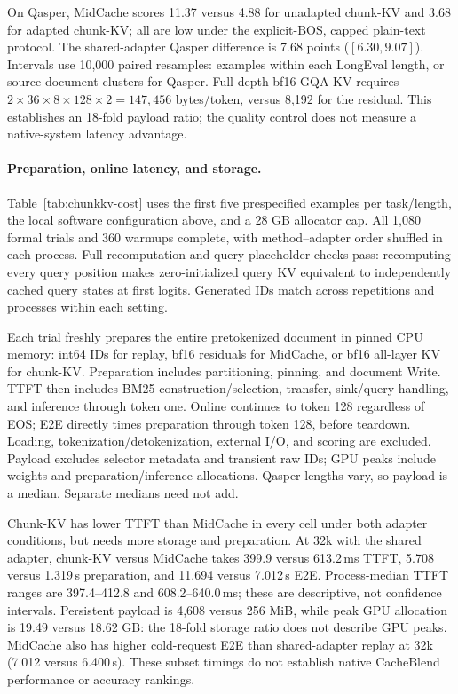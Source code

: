 On Qasper, MidCache scores 11.37 versus 4.88 for unadapted chunk-KV and 3.68 for adapted chunk-KV; all are low under the explicit-BOS, capped plain-text protocol. The shared-adapter Qasper difference is 7.68 points ($[6.30,9.07]$). Intervals use 10,000 paired resamples: examples within each LongEval length, or source-document clusters for Qasper. Full-depth bf16 GQA KV requires $2\times36\times8\times128\times2=147{,}456$ bytes/token, versus 8,192 for the residual. This establishes an 18-fold payload ratio; the quality control does not measure a native-system latency advantage.

\paragraph{Preparation, online latency, and storage.}

Table~\ref{tab:chunkkv-cost} uses the first five prespecified examples per task/length, the local software configuration above, and a 28 GB allocator cap. All 1,080 formal trials and 360 warmups complete, with method--adapter order shuffled in each process. Full-recomputation and query-placeholder checks pass: recomputing every query position makes zero-initialized query KV equivalent to independently cached query states at first logits. Generated IDs match across repetitions and processes within each setting.

Each trial freshly prepares the entire pretokenized document in pinned CPU memory: int64 IDs for replay, bf16 residuals for MidCache, or bf16 all-layer KV for chunk-KV. Preparation includes partitioning, pinning, and document Write. TTFT then includes BM25 construction/selection, transfer, sink/query handling, and inference through token one. Online continues to token 128 regardless of EOS; E2E directly times preparation through token 128, before teardown. Loading, tokenization/detokenization, external I/O, and scoring are excluded. Payload excludes selector metadata and transient raw IDs; GPU peaks include weights and preparation/inference allocations. Qasper lengths vary, so payload is a median. Separate medians need not add.

Chunk-KV has lower TTFT than MidCache in every cell under both adapter conditions, but needs more storage and preparation. At 32k with the shared adapter, chunk-KV versus MidCache takes 399.9 versus 613.2\,ms TTFT, 5.708 versus 1.319\,s preparation, and 11.694 versus 7.012\,s E2E. Process-median TTFT ranges are 397.4--412.8 and 608.2--640.0\,ms; these are descriptive, not confidence intervals. Persistent payload is 4,608 versus 256 MiB, while peak GPU allocation is 19.49 versus 18.62 GB: the 18-fold storage ratio does not describe GPU peaks. MidCache also has higher cold-request E2E than shared-adapter replay at 32k (7.012 versus 6.400\,s). These subset timings do not establish native CacheBlend performance or accuracy rankings.

